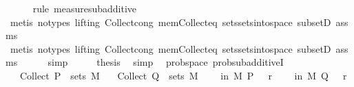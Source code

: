 \begin{isabellebody}
\ \ \ \ \isamarkupfalse%
\ {\isacharparenleft}{\kern0pt}rule\ measure{\isacharunderscore}{\kern0pt}subadditive{\isacharparenright}{\kern0pt}\isanewline
\ \ \ \ \isamarkupfalse%
\ {\isacharparenleft}{\kern0pt}metis\ {\isacharparenleft}{\kern0pt}no{\isacharunderscore}{\kern0pt}types{\isacharcomma}{\kern0pt}\ lifting{\isacharparenright}{\kern0pt}\ Collect{\isacharunderscore}{\kern0pt}cong\ mem{\isacharunderscore}{\kern0pt}Collect{\isacharunderscore}{\kern0pt}eq\ sets{\isachardot}{\kern0pt}sets{\isacharunderscore}{\kern0pt}into{\isacharunderscore}{\kern0pt}space\ subsetD\ assms{\isacharparenleft}{\kern0pt}{}{\isacharparenright}{\kern0pt}{\isacharparenright}{\kern0pt}\isanewline
\ \ \ \ \isamarkupfalse%
\ {\isacharparenleft}{\kern0pt}metis\ {\isacharparenleft}{\kern0pt}no{\isacharunderscore}{\kern0pt}types{\isacharcomma}{\kern0pt}\ lifting{\isacharparenright}{\kern0pt}\ Collect{\isacharunderscore}{\kern0pt}cong\ mem{\isacharunderscore}{\kern0pt}Collect{\isacharunderscore}{\kern0pt}eq\ sets{\isachardot}{\kern0pt}sets{\isacharunderscore}{\kern0pt}into{\isacharunderscore}{\kern0pt}space\ subsetD\ assms{\isacharparenleft}{\kern0pt}{}{\isacharparenright}{\kern0pt}{\isacharparenright}{\kern0pt}\isanewline
\ \ \ \ \isamarkupfalse%
\ simp{\isacharplus}{\kern0pt}\isanewline
\ \ \isamarkupfalse%
\ \isamarkupfalse%
\ {\isacharquery}{\kern0pt}thesis\ \isamarkupfalse%
\ simp\isanewline
{}\isamarkupfalse%
%
\endisatagproof
{\isafoldproof}%
%
\isadelimproof
\isanewline
%
\endisadelimproof
\isanewline
{}\isamarkupfalse%
\ {\isacharparenleft}{\kern0pt}\ prob{\isacharunderscore}{\kern0pt}space{\isacharparenright}{\kern0pt}\ prob{\isacharunderscore}{\kern0pt}sub{\isacharunderscore}{\kern0pt}additiveI{\isacharcolon}{\kern0pt}\isanewline
\ \ \ {\isachardoublequoteopen}Collect\ P\ {\isasymin}\ sets\ M{\isachardoublequoteclose}\isanewline
\ \ \ {\isachardoublequoteopen}Collect\ Q\ {\isasymin}\ sets\ M{\isachardoublequoteclose}\isanewline
\ \ \ {\isachardoublequoteopen}{\isasymP}{\isacharparenleft}{\kern0pt}{\isasymomega}\ in\ M{\isachardot}{\kern0pt}\ P\ {\isasymomega}{\isacharparenright}{\kern0pt}\ {\isasymle}\ r{}{\isachardoublequoteclose}\isanewline
\ \ \ {\isachardoublequoteopen}{\isasymP}{\isacharparenleft}{\kern0pt}{\isasymomega}\ in\ M{\isachardot}{\kern0pt}\ Q\ {\isasymomega}{\isacharparenright}{\kern0pt}\ {\isasymle}\ r{}{\isachardoublequoteclose}\isanewline

\end{isabellebody}
